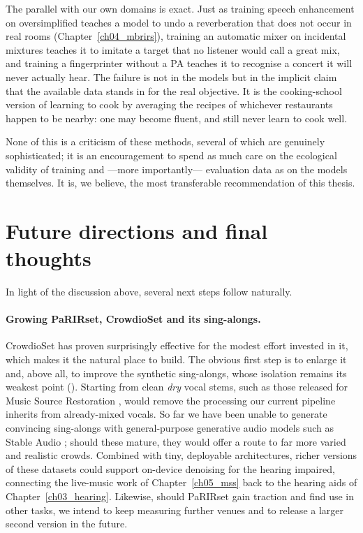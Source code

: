 The parallel with our own domains is exact. Just as training speech enhancement
on oversimplified  teaches a model to undo a reverberation that
does not occur in real rooms (Chapter~\ref{ch04_mbrirs}), training an automatic
mixer on incidental mixtures teaches it to imitate a target that no listener
would call a great mix, and training a fingerprinter without a \acrshort{PA}
teaches it to recognise a concert it will never actually hear. The failure is not
in the models but in the implicit claim that the available data stands in for the
real objective. It is the cooking-school version of learning to cook by averaging
the recipes of whichever restaurants happen to be nearby: one may become fluent,
and still never learn to cook well.

None of this is a criticism of these methods, several of which are genuinely
sophisticated; it is an encouragement to spend as much care on the ecological
validity of training and ---more importantly--- evaluation data as on the models themselves. It is, we believe, the most
transferable recommendation of this thesis.

\vspace{1cm}

\section{Future directions and final thoughts}
\label{sec:conc_future}

In light of the discussion above, several next steps follow naturally.

\paragraph{Growing PaRIRset, CrowdioSet and its sing-alongs.}
CrowdioSet has proven surprisingly effective for the modest effort invested in
it, which makes it the natural place to build. The obvious first step is to
enlarge it and, above all, to improve the synthetic sing-alongs, whose isolation
remains its weakest point (). Starting from clean \emph{dry} vocal
stems, such as those released for Music Source Restoration
\citep{zang2025music}, would remove the processing our current pipeline inherits
from already-mixed vocals. So far we have been unable to generate convincing
sing-alongs with general-purpose generative audio models such as Stable Audio
\citep{evans2024stable}; should these mature, they would offer a route to far
more varied and realistic crowds. Combined with tiny, deployable architectures,
richer versions of these datasets could support on-device denoising for the
hearing impaired, connecting the live-music work of Chapter~\ref{ch05_mss} back
to the hearing aids of Chapter~\ref{ch03_hearing}. Likewise, should PaRIRset gain
traction and find use in other tasks, we intend to keep measuring further venues
and to release a larger second version in the future.

